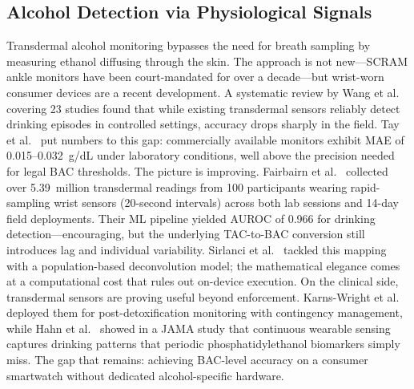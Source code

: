 \documentclass[HARVARD,Times2COL]{WileyNJDv5}
\begin{document}
\subsection{Alcohol Detection via Physiological Signals}
Transdermal alcohol monitoring bypasses the need for breath sampling by measuring ethanol diffusing through the skin. The approach is not new---SCRAM ankle monitors have been court-mandated for over a decade---but wrist-worn consumer devices are a recent development. A systematic review by Wang et al.~\citep{wang2022jmir} covering 23 studies found that while existing transdermal sensors reliably detect drinking episodes in controlled settings, accuracy drops sharply in the field. Tay et al.~\citep{tay2023} put numbers to this gap: commercially available monitors exhibit MAE of 0.015--0.032~g/dL under laboratory conditions, well above the precision needed for legal BAC thresholds.
The picture is improving. Fairbairn et al.~\citep{fairbairn2025} collected over 5.39~million transdermal readings from 100 participants wearing rapid-sampling wrist sensors (20-second intervals) across both lab sessions and 14-day field deployments. Their ML pipeline yielded AUROC of 0.966 for drinking detection---encouraging, but the underlying TAC-to-BAC conversion still introduces lag and individual variability. Sirlanci et al.~\citep{sirlanci2019} tackled this mapping with a population-based deconvolution model; the mathematical elegance comes at a computational cost that rules out on-device execution.
On the clinical side, transdermal sensors are proving useful beyond enforcement. Karns-Wright et al.~\citep{karns-wright2025} deployed them for post-detoxification monitoring with contingency management, while Hahn et al.~\citep{hahn2023} showed in a JAMA study that continuous wearable sensing captures drinking patterns that periodic phosphatidylethanol biomarkers simply miss. The gap that remains: achieving BAC-level accuracy on a consumer smartwatch without dedicated alcohol-specific hardware.
\end{document}
